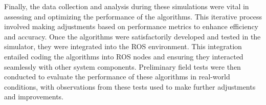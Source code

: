 Finally, the data collection and analysis during these simulations were vital in assessing and optimizing the performance of the algorithms. This iterative process involved making adjustments based on performance metrics to enhance efficiency and accuracy. Once the algorithms were satisfactorily developed and tested in the simulator, they were integrated into the ROS environment. This integration entailed coding the algorithms into ROS nodes and ensuring they interacted seamlessly with other system components. Preliminary field tests were then conducted to evaluate the performance of these algorithms in real-world conditions, with observations from these tests used to make further adjustments and improvements.

